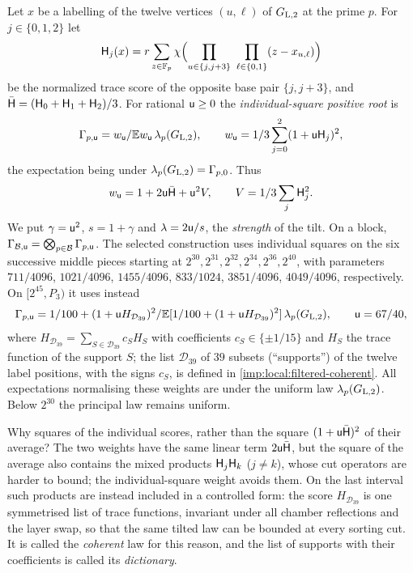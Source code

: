 \begin{definition}\label{def:positive-root}
Let $x$ be a labelling of the twelve vertices $(u,\ell)$ of $G_{\rm L,2}$ at the
prime $p$. For $j\in\{0,1,2\}$ let
\[
 \Hs j(x)=r\sum_{z\in\Fp}\chi\Bigl(\prod_{u\in\{j,j+3\}}\ \prod_{\ell\in\{0,1\}}
 (z-x_{u,\ell})\Bigr)
\]
be the normalized trace score of the opposite base pair $\{j,j+3\}$, and
$\bar{\mathsf H}=(\mathsf H_{0}+\mathsf H_{1}+\mathsf H_{2})/3$. For rational $\mathsf u\ge0$ the
\emph{individual-square positive root} is
\begin{equation}\label{eq:positive-root}
 \Gamma_{p,\mathsf u}=w_\mathsf u/\mathbb E w_\mathsf u\,\lambda_p(G_{\rm L,2}),\qquad
 w_\mathsf u=1/3\sum_{j=0}^2(1+\mathsf u\mathsf H_{j})^2,
\end{equation}
the expectation being under $\lambda_p(G_{\rm L,2})=\Gamma_{p,0}$. Thus
\[
 w_\mathsf u=1+2\mathsf u\bar{\mathsf H}+\mathsf u^2 V,
 \qquad V=1/3\sum_j\mathsf H_{j}^2.
\]
We put $\gamma=\mathsf u^2$, $s=1+\gamma$ and $\lambda=2\mathsf u/s$,
the \emph{strength} of the tilt. On a block,
$\Gamma_{\mathcal B,\mathsf u}=\bigotimes_{p\in\mathcal B}\Gamma_{p,\mathsf u}$. The selected construction uses individual squares on the six successive
middle pieces starting at $2^{30},2^{31},2^{32},2^{34},2^{36},2^{40}$, with parameters
$711/4096$, $1021/4096$, $1455/4096$, $833/1024$, $3851/4096$, $4049/4096$,
respectively. On $[2^{45},P_3)$ it uses instead
\[
 \Gamma_{p,\mathsf u}=
 1/100+(1+\mathsf u H_{\mathcal D_{39}})^2/\mathbb E[1/100+(1+\mathsf u H_{\mathcal D_{39}})^2]
 \,\lambda_p(G_{\rm L,2}),\qquad \mathsf u=67/40,
\]
where $H_{\mathcal D_{39}}=\sum_{S\in\mathcal D_{39}}c_SH_S$
with coefficients $c_S\in\{\pm1/15\}$ and $H_S$ the trace
function of the support $S$; the list $\mathcal D_{39}$ of $39$
subsets (``supports'') of the twelve label positions, with the
signs $c_S$, is defined in \cref{imp:local:filtered-coherent}. All expectations normalising
these weights are under the uniform law $\lambda_p(G_{\rm L,2})$.
Below $2^{30}$ the principal law remains uniform.
\end{definition}

Why squares of the individual scores, rather than the square
$(1+\mathsf u\bar{\mathsf H})^2$ of their average? The two weights have the same
linear term $2\mathsf u\bar{\mathsf H}$, but the square of the average also
contains the mixed products $\mathsf H_{j}\mathsf H_{k}$ ($j\ne k$), whose cut
operators are harder to bound; the individual-square weight
avoids them. On the last interval such products are instead
included in a controlled form: the score $H_{\mathcal D_{39}}$ is
one symmetrised list of trace functions, invariant under all
chamber reflections and the layer swap, so that the same tilted
law can be bounded at every sorting cut. It is called the
\emph{coherent} law for this reason, and the list of supports
with their coefficients is called its \emph{dictionary}.

